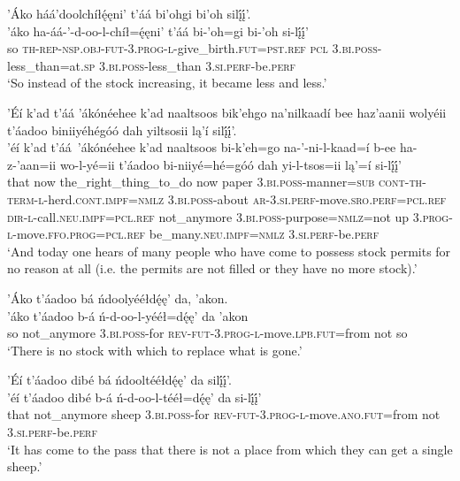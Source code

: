 \ea\label{ex:text7-15-12}
’Áko háá’doolchíłę́ęni’ t’áá bi’ohgi bi’oh silį́į́’.\\
\gll ’áko	ha-áá-’-d-oo-l-chíł=ę́ęni’	t’áá	bi-’oh=gi	bi-’oh	si-lį́į́’\\
     so	\textsc{th}-\textsc{rep}-\textsc{nsp}.\textsc{obj}-\textsc{fut}-3.\textsc{prog}-\textsc{l}-give\_birth.\textsc{fut}=\textsc{pst}.\textsc{ref}	\textsc{pcl}	3.\textsc{bi}.\textsc{poss}-less\_than=at.\textsc{sp}	3.\textsc{bi}.\textsc{poss}-less\_than	3.\textsc{si}.\textsc{perf}-be.\textsc{perf}\\
\glt `So instead of the stock increasing, it became less and less.'
\z

\ea\label{ex:text7-15-13}
’Éí k’ad t’áá ’ákónéehee k’ad naaltsoos bik’ehgo na’nilkaadí bee haz’aanii wolyéii t’áadoo biniiyéhégóó dah yiltsosii lą’í silį́į́’.\\
\gll ’éí	k’ad	t’áá~{’ákónéehee}	k’ad	naaltsoos	bi-k’eh=go	na-’-ni-l-kaad=í	b-ee	ha-z-’aan=ii	wo-l-yé=ii	t’áadoo	bi-niiyé=hé=góó	dah	yi-l-tsos=ii	lą’=í	si-lį́į́’\\
     that	now	the\_right\_thing\_to\_do	now	paper	3.\textsc{bi}.\textsc{poss}-manner=\textsc{sub}	\textsc{cont}-\textsc{th}-\textsc{term}-\textsc{l}-herd.\textsc{cont}.\textsc{impf}=\textsc{nmlz}	3.\textsc{bi}.\textsc{poss}-about	\textsc{ar}-3.\textsc{si}.\textsc{perf}-move.\textsc{sro}.\textsc{perf}=\textsc{pcl}.\textsc{ref}	\textsc{dir}-\textsc{l}-call.\textsc{neu}.\textsc{impf}=\textsc{pcl}.\textsc{ref}	not\_anymore	3.\textsc{bi}.\textsc{poss}-purpose=\textsc{nmlz}=not	up	3.\textsc{prog}-\textsc{l}-move.\textsc{ffo}.\textsc{prog}=\textsc{pcl}.\textsc{ref}	be\_many.\textsc{neu}.\textsc{impf}=\textsc{nmlz}	3.\textsc{si}.\textsc{perf}-be.\textsc{perf}\\
\glt `And today one hears of many people who have come to possess stock permits for no reason at all (i.e. the permits are not filled or they have no more stock).'
\z

\ea\label{ex:text7-15-14}
’Áko t’áadoo bá ńdoolyééłdę́ę’ da, ’akon.\\
\gll ’áko	t’áadoo	b-á	ń-d-oo-l-yééł=dę́ę’	da	’akon\\
     so	not\_anymore	3.\textsc{bi}.\textsc{poss}-for	\textsc{rev}-\textsc{fut}-3.\textsc{prog}-\textsc{l}-move.\textsc{lpb}.\textsc{fut}=from	not	so\\
\glt `There is no stock with which to replace what is gone.'
\z

\ea\label{ex:text7-15-15}
’Éí t’áadoo dibé bá ńdooltééłdę́ę’ da silį́į́’.\\
\gll ’éí	t’áadoo	dibé	b-á	ń-d-oo-l-tééł=dę́ę’	da	si-lį́į́’\\
     that	not\_anymore	sheep	3.\textsc{bi}.\textsc{poss}-for	\textsc{rev}-\textsc{fut}-3.\textsc{prog}-\textsc{l}-move.\textsc{ano}.\textsc{fut}=from	not	3.\textsc{si}.\textsc{perf}-be.\textsc{perf}\\
\glt `It has come to the pass that there is not a place from which they can get a single sheep.'
\z

